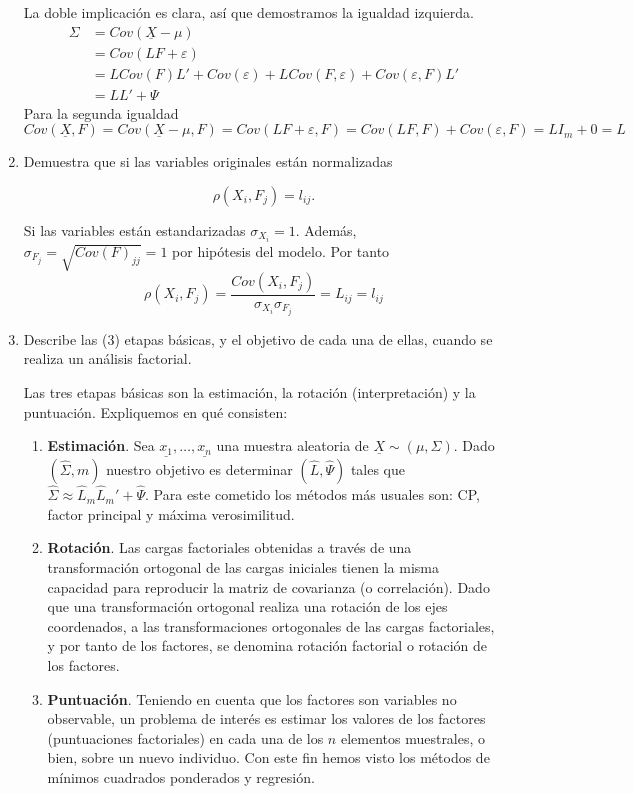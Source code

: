 \documentclass[twoside]{article}
\newcommand{\muestra}[1]{{\underline{#1}}}
\newcommand{\mX}{{\muestra{X}}}
\begin{document}
\begin{enumerate}
La doble implicación es clara, así que demostramos la igualdad izquierda.
\begin{align*}
\Sigma &= Cov(\mX-\mu) \\
&= Cov(LF+\varepsilon)\\
&= LCov(F)L' + Cov(\varepsilon) +LCov(F,\varepsilon)+Cov(\varepsilon,F)L' \\
&= LL'+\Psi
\end{align*}
Para la segunda igualdad
$$
Cov(\mX,F) = Cov(\mX-\mu,F) = Cov(LF+\varepsilon,F) = Cov(LF,F)+Cov(\varepsilon,F) = LI_m + 0 = L
$$
\item Demuestra que si las variables originales están normalizadas

\[ \rho(X_i, F_j) = l_{ij}. \]

Si las variables están estandarizadas ${\sigma}_{X_i}=1$. Además, $\sigma_{F_j}=\sqrt{Cov(F)_{jj}} = 1$ por hipótesis del modelo. Por tanto
$$
\rho(X_i,F_j) = \frac{Cov(X_i,F_j)}{\sigma_{X_i}\sigma_{F_j}} = L_{ij} = l_{ij}
$$
\item Describe las (3) etapas básicas, y el objetivo de cada una de ellas, cuando se realiza un análisis factorial.

Las tres etapas básicas son la estimación, la rotación (interpretación) y la puntuación. Expliquemos en qué consisten:

\begin{enumerate}
\item \textbf{Estimación}. Sea $\muestra{x_1},\dotsc,\muestra{x_n}$ una muestra aleatoria de $\mX\sim (\mu,\Sigma)$. Dado $(\hat{\Sigma},m)$ nuestro objetivo es determinar $(\hat{L},\hat{\Psi})$ tales que $\hat{\Sigma}\approx \hat{L}_m\hat{L}_m'+\hat{\Psi}$. Para este cometido los métodos más usuales son: CP, factor principal y máxima verosimilitud.
\item \textbf{Rotación}. Las cargas factoriales obtenidas a través de una transformación ortogonal de las cargas iniciales tienen la misma capacidad para reproducir la matriz de covarianza (o correlación). Dado que una transformación ortogonal realiza una rotación de los ejes coordenados, a las transformaciones ortogonales de las cargas factoriales, y por tanto de los factores, se denomina rotación factorial o rotación de los factores.

\item \textbf{Puntuación}. Teniendo en cuenta que los factores son variables no observable, un problema de interés
es estimar los valores de los factores (puntuaciones factoriales) en cada una de los $n$ elementos muestrales, o bien, sobre un nuevo individuo. Con este fin hemos visto los métodos de mínimos cuadrados ponderados y regresión.
\end{enumerate}


\end{enumerate}
\end{document}
